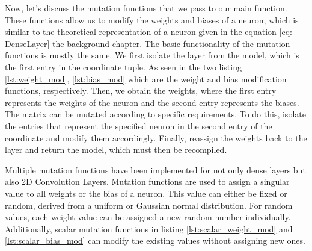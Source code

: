 


Now, let's discuss the mutation functions that we pass to our main function.
These functions allow us to modify the weights and biases of a neuron, which is similar to the theoretical representation of a neuron given in the equation \ref{eq: DenseLayer} the background chapter.
The basic functionality of the mutation functions is mostly the same.
We first isolate the layer from the model, which is the first entry in the coordinate tuple.
As seen in the two listing \ref{lst:weight_mod}, \ref{lst:bias_mod} which are the weight and bias modification functions, respectively.
Then, we obtain the weights, where the first entry represents the weights of the neuron and the second entry represents the biases.
The matrix can be mutated according to specific requirements.
To do this, isolate the entries that represent the specified neuron in the second entry of the coordinate and modify them accordingly.
Finally, reassign the weights back to the layer and return the model, which must then be recompiled.




Multiple mutation functions have been implemented for not only dense layers but also 2D Convolution Layers.
Mutation functions are used to assign a singular value to all weights or the bias of a neuron.
This value can either be fixed or random, derived from a uniform or Gaussian normal distribution.
For random values, each weight value can be assigned a new random number individually.
Additionally, scalar mutation functions in listing \ref{lst:scalar_weight_mod} and \ref{lst:scalar_bias_mod} can modify the existing values without assigning new ones.


